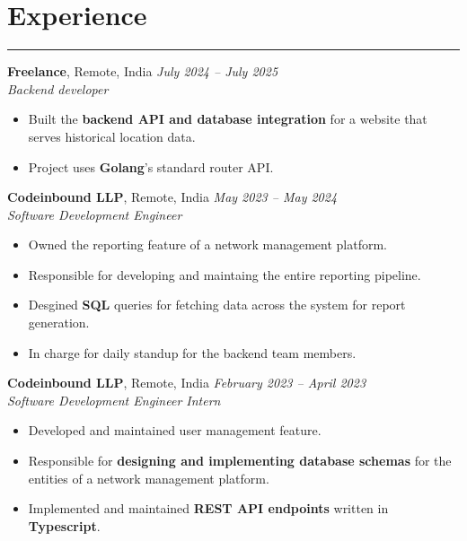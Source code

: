 \documentclass[11pt]{article}
\begin{document}
\section*{Experience}
\hrule

\textbf{Freelance}, Remote, India \hfill \textit{July 2024 -- July 2025} \\
\textit{Backend developer} \\
\vspace{-1.5\baselineskip}
\begin{itemize}[label=--]
	\item Built the \textbf{backend API and database integration} for a website that
	    serves historical location data.
	\item Project uses \textbf{Golang}'s standard router API.
\end{itemize}

\textbf{Codeinbound LLP}, Remote, India \hfill \textit{May 2023 -- May 2024} \\
\textit{Software Development Engineer} \\
\vspace{-1.5\baselineskip}
\begin{itemize}[label=--]
	\item Owned the reporting feature of a network management platform.
	\item Responsible for developing and maintaing the entire reporting
		pipeline.
	\item Desgined \textbf{SQL} queries for fetching data across the system for
		report generation.
	\item In charge for daily standup for the backend team members.
\end{itemize}

\textbf{Codeinbound LLP}, Remote, India \hfill
\textit{February 2023 -- April 2023} \\
\textit{Software Development Engineer Intern} \\
\vspace{-1.5\baselineskip}
\begin{itemize}[label=--]
	\item Developed and maintained user management feature.
	\item Responsible for
		\textbf{designing and implementing database schemas}
		for the entities of a network management platform.
	\item Implemented and maintained \textbf{REST API endpoints} written
		in \textbf{Typescript}.
\end{itemize}
\end{document}

